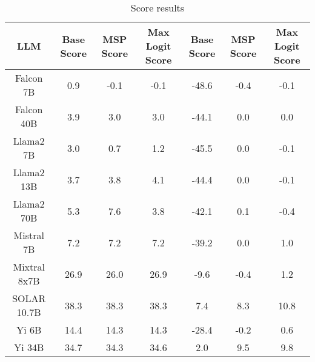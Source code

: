 \renewcommand\arraystretch{1.2}
\begin{table*}
\centering
\begin{tabular}{c|c|c|c|c|c|c}
LLM & Base Score & MSP Score & Max Logit Score & Base Score & MSP Score & Max Logit Score\\ \hline
Falcon 7B & 0.9 & -0.1 & -0.1 & -48.6 & -0.4 & -0.1\\
Falcon 40B & 3.9 & 3.0 & 3.0 & -44.1 & 0.0 & 0.0\\
Llama2 7B & 3.0 & 0.7 & 1.2 & -45.5 & 0.0 & -0.1\\
Llama2 13B & 3.7 & 3.8 & 4.1 & -44.4 & 0.0 & -0.1\\
Llama2 70B & 5.3 & 7.6 & 3.8 & -42.1 & 0.1 & -0.4\\
Mistral 7B & 7.2 & 7.2 & 7.2 & -39.2 & 0.0 & 1.0\\
Mixtral 8x7B & 26.9 & 26.0 & 26.9 & -9.6 & -0.4 & 1.2\\
SOLAR 10.7B & 38.3 & 38.3 & 38.3 & 7.4 & 8.3 & 10.8\\
Yi 6B & 14.4 & 14.3 & 14.3 & -28.4 & -0.2 & 0.6\\
Yi 34B & 34.7 & 34.3 & 34.6 & 2.0 & 9.5 & 9.8\\
\hline
\end{tabular}
\caption{Score results}
\end{table*}
\label{tab:score}
